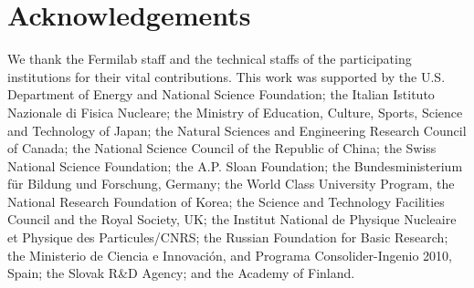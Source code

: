 \documentclass[12pt,twoside,letterpaper,doublespace]{article}
\begin{document}


\section{Acknowledgements}
We thank the Fermilab staff and the technical staffs of the participating institutions for their vital contributions. This work was supported by the U.S. Department of Energy and National Science Foundation; the Italian Istituto Nazionale di Fisica Nucleare; the Ministry of Education, Culture, Sports, Science and Technology of Japan; the Natural Sciences and Engineering Research Council of Canada; the National Science Council of the Republic of China; the Swiss National Science Foundation; the A.P. Sloan Foundation; the Bundesministerium f\"ur Bildung und Forschung, Germany; the World Class University Program, the National Research Foundation of Korea; the Science and Technology Facilities Council and the Royal Society, UK; the Institut National de Physique Nucleaire et Physique des Particules/CNRS; the Russian Foundation for Basic Research; the Ministerio de Ciencia e Innovaci\'{o}n, and Programa Consolider-Ingenio 2010, Spain; the Slovak R\&D Agency; and the Academy of Finland.
\end{document}
